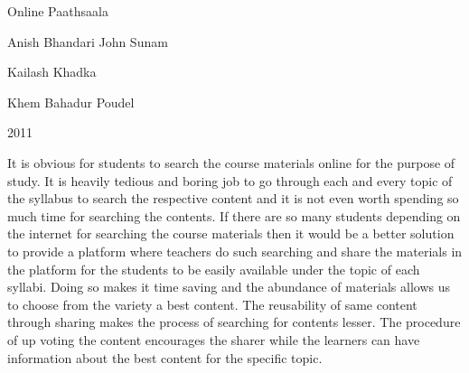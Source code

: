  \begin{conf-abstract}[]
 {Online Paathsaala}
 {
Anish Bhandari
John Sunam

Kailash Khadka

Khem Bahadur Poudel

 }
{2011}

It is obvious for students to search the course materials online for the purpose of study. It is heavily tedious and boring job to go through each and every topic of the syllabus to search the respective content and it is not even worth spending so much time for searching the contents. If there are so many students depending on the internet for searching the course materials then it would be a better solution to provide a platform where teachers do such searching and share the materials in the platform for the students to be easily available under the topic of each syllabi. Doing so makes it time saving and the abundance of materials allows us to choose from the variety a best content. The reusability of same content through sharing makes the process of searching for contents lesser. The procedure of up voting the content encourages the sharer while the learners can have information about the best content for the specific topic.  
 \end{conf-abstract}